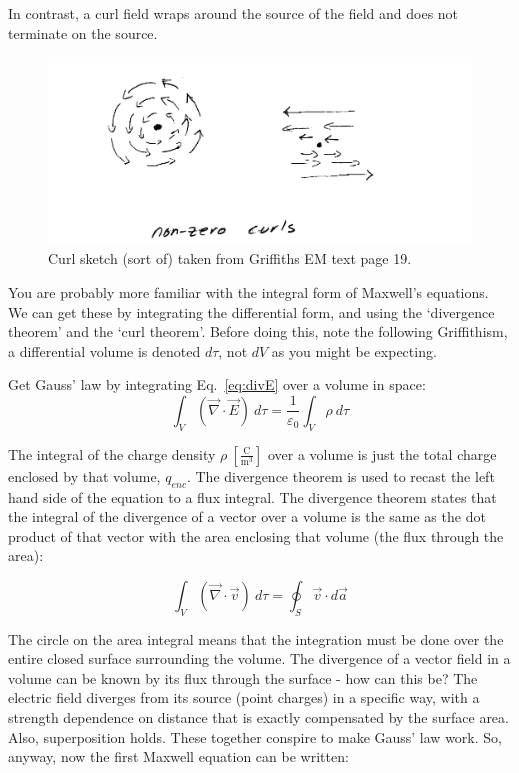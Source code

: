 \documentclass[12pt]{article}
\begin{document}
\begin{flushleft}
 In contrast, a curl field wraps around the source of the field and does not terminate on the source.

\begin{figure}[h]
\centering
\includegraphics*[trim=0cm 0cm 0cm 0cm, clip=true, width=0.6\columnwidth]{curldraw.png}
\caption{Curl sketch (sort of) taken from Griffiths EM text page 19.}
\label{fig:curldraw}
\end{figure}

You are probably more familiar with the integral form of Maxwell's equations.  We can get these by integrating the differential form, and using the `divergence theorem' and the `curl theorem'.  Before doing this, note the following Griffithism, a differential volume is denoted $d\tau$, not $dV$ as you might be expecting.

Get Gauss' law by integrating Eq.~\ref{eq:divE} over a volume in space:
\begin{equation*}
\int_{V} (\vec{\nabla} \cdot \vec{E}) \: d\tau  =  \frac{1}{\varepsilon_{0}} \int_{V} \rho \: d\tau
\end{equation*}

The integral of the charge density $\rho \: \left[ \frac{ \mbox{C} }{ \mbox{m}^{3} } \right]$ over a volume is just the total charge enclosed by that volume, $q_{enc}$.  The divergence theorem is used to recast the left hand side of the equation to a flux integral.  The divergence theorem states that the integral of the divergence of a vector over a volume is the same as the dot product of that vector with the area enclosing that volume (the flux through the area):

\begin{equation*}
\int_{V} (\vec{\nabla} \cdot \vec{v}) \: d\tau  =   \oint_{S} \vec{v} \cdot d\vec{a} 
\end{equation*}

The circle on the area integral means that the integration must be done over the entire closed surface surrounding the volume.  The divergence of a vector field in a volume can be known by its flux through the surface - how can this be?  The electric field diverges from its source (point charges) in a specific way, with a  strength dependence on distance that is exactly compensated by the surface area.  Also, superposition holds.  These together conspire to make Gauss' law work.  So, anyway, now the first Maxwell equation can be written:


\end{flushleft}
\end{document}
